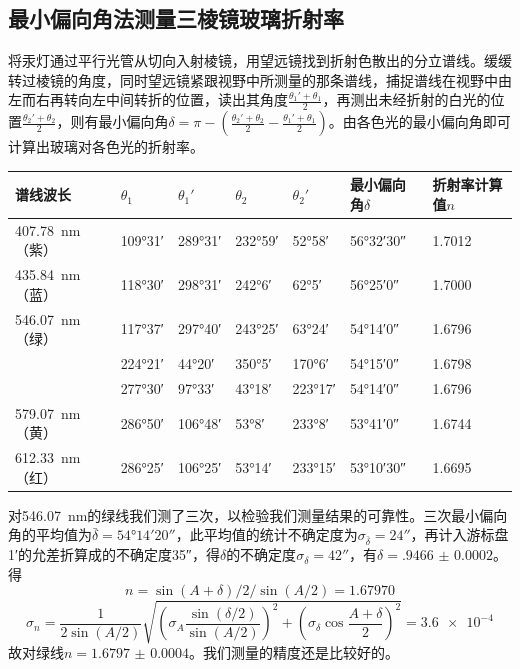 \documentclass[UTF8]{ctexart}
\begin{document}
\subsection{最小偏向角法测量三棱镜玻璃折射率}
将汞灯通过平行光管从切向入射棱镜，用望远镜找到折射色散出的分立谱线。缓缓转过棱镜的角度，同时望远镜紧跟视野中所测量的那条谱线，捕捉谱线在视野中由左而右再转向左中间转折的位置，读出其角度$\frac{\theta_1'+\theta_1}{2}$，再测出未经折射的白光的位置$\frac{\theta_2'+\theta_2}{2}$，则有最小偏向角$\delta=\pi-(\frac{\theta_2'+\theta_2}{2}-\frac{\theta_1'+\theta_1}{2})$。由各色光的最小偏向角即可计算出玻璃对各色光的折射率。
\begin{center}
\noindent
\begin{tabu} to 0.9\linewidth {X[c,-10]|X[c,-10] X[c,-10]|X[c,-10] X[c,-10]||X[c]|X[c]}
\hline
谱线波长	&$\theta_1$	&$\theta_1'$	&$\theta_2$	&$\theta_2'$	&最小偏向角$\delta$	&折射率计算值$n$
\\
\hline
\SI{407.78}{\nm}（紫）	&\ang{109;31;}	&\ang{289;31;}	&\ang{232;59;}	&\ang{52;58;}	&\ang{56;32;30}	&1.7012
\\
\SI{435.84}{\nm}（蓝）	&\ang{118;30;}	&\ang{298;31;}	&\ang{242;6;}	&\ang{62;5;}	&\ang{56;25;0}	&1.7000
\\
\SI{546.07}{\nm}（绿）	&\ang{117;37;}	&\ang{297;40;}	&\ang{243;25;}	&\ang{63;24;}	&\ang{54;14;0}	&1.6796
\\
	&\ang{224;21;}	&\ang{44;20;}	&\ang{350;5;}	&\ang{170;6;}	&\ang{54;15;0}	&1.6798
\\
	&\ang{277;30;}	&\ang{97;33;}	&\ang{43;18;}	&\ang{223;17;}	&\ang{54;14;0}	&1.6796
\\
\SI{579.07}{\nm}（黄）	&\ang{286;50;}	&\ang{106;48;}	&\ang{53;8;}	&\ang{233;8;}	&\ang{53;41;0}	&1.6744
\\
\SI{612.33}{\nm}（红）	&\ang{286;25;}	&\ang{106;25;}	&\ang{53;14;}	&\ang{233;15;}	&\ang{53;10;30}	&1.6695
\\
\hline
\end{tabu}
\end{center}
对\SI{546.07}{\nm}的绿线我们测了三次，以检验我们测量结果的可靠性。三次最小偏向角的平均值为$\bar{\delta}=\ang{54;14;20}$，此平均值的统计不确定度为$\sigma_{\bar{\delta}}=\ang{;;24}$，再计入游标盘\ang{;1;}的允差折算成的不确定度\ang{;;35}，得$\delta$的不确定度$\sigma_{\delta}=\ang{;;42}$，有$\delta=\num{.9466(2)}$。得
\[
n=\sin{(A+\delta)/2}/\sin{(A/2)}=\num{1.67970}
\]
\[
\sigma_n=\frac{1}{2\sin{(A/2)}}\sqrt{(\sigma_A\frac{\sin{(\delta/2)}}{\sin{(A/2)}})^2+(\sigma_{\delta}\cos{\frac{A+\delta}{2}})^2}=\num{3.6e-4}
\]
故对绿线$n=\num{1.6797(4)}$。我们测量的精度还是比较好的。
\end{document}
